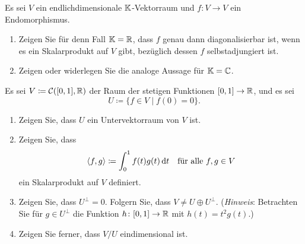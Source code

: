 \documentclass[a4paper,10pt]{scrartcl}
\begin{document}
\begin{question}
  Es sei $V$ ein endlichdimensionale $\mathbb{K}$-Vektorraum und $f \colon V \to V$ ein Endomorphismus.
  \begin{enumerate}[leftmargin=*]
    \item
      Zeigen Sie für denn Fall $\mathbb{K} = \mathbb{R}$, dass $f$ genau dann diagonalisierbar ist, wenn es ein Skalarprodukt auf $V$ gibt, bezüglich dessen $f$ selbstadjungiert ist.
    \item
      Zeigen oder widerlegen Sie die analoge Aussage für $\mathbb{K} = \mathbb{C}$.
  \end{enumerate}
\end{question}



\begin{question}
  Es sei $V \coloneqq \mathcal{C}([0,1], \mathbb{R})$ der Raum der stetigen Funktionen $[0,1] \to \mathbb{R}$, und es sei
  \[
    U \coloneqq \{ f \in V \mid f(0) = 0 \}.
  \]
  \begin{enumerate}[leftmargin=*]
    \item
      Zeigen Sie, dass $U$ ein Untervektorraum von $V$ ist.
    \item
      Zeigen Sie, dass
      \[
        \langle f, g \rangle \coloneqq \int_0^1 f(t) g(t) \,\text{d}t
        \quad
        \text{für alle $f, g \in V$}
      \]
      ein Skalarprodukt auf $V$ definiert.
    \item
      Zeigen Sie, dass $U^\perp = 0$.
      Folgern Sie, dass $V \neq U \oplus U^\perp$.
      (\emph{Hinweis}: Betrachten Sie für $g \in U^\perp$ die Funktion $h \colon [0,1] \to \mathbb{R}$ mit $h(t) = t^2 g(t)$.)
    \item
      Zeigen Sie ferner, dass $V/U$ eindimensional ist.
  \end{enumerate}
\end{question}
\end{document}
